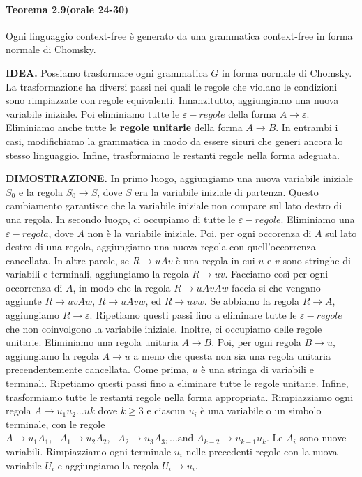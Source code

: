 \documentclass{article}
\begin{document}
\paragraph{Teorema 2.9(orale 24-30)} 
\begin{tcolorbox}[colback=yellow!10!white, colframe=yellow!50!black, title=Teorema 2.9]
    Ogni linguaggio context-free è generato da una grammatica context-free in forma normale di Chomsky.
\end{tcolorbox}

\textbf{IDEA.}
Possiamo trasformare ogni grammatica $G$ in forma normale di Chomsky. La trasformazione ha diversi passi nei quali le regole che violano le condizioni sono rimpiazzate con regole equivalenti. Innanzitutto, aggiungiamo una nuova variabile iniziale. Poi eliminiamo tutte le \textbf{$\varepsilon-regole$} della forma $A \rightarrow \varepsilon$. Eliminiamo anche tutte le \textbf{regole unitarie} della forma $A \rightarrow B$. In entrambi i casi, modifichiamo la grammatica in modo da essere sicuri che generi ancora lo stesso linguaggio. Infine, trasformiamo le restanti regole nella forma adeguata.
\vspace{1em}

\textbf{DIMOSTRAZIONE.}
In primo luogo, aggiungiamo una nuova variabile iniziale $S_0$ e la regola $S_0 \rightarrow S$, dove $S$ era la variabile iniziale di partenza.
Questo cambiamento garantisce che la variabile iniziale non compare sul lato destro di una regola.
In secondo luogo, ci occupiamo di tutte le $\varepsilon-regole$. Eliminiamo una $\varepsilon-regola$, dove $A$ non è la variabile iniziale. Poi, per ogni occorenza di $A$ sul lato destro di una regola, aggiungiamo una nuova regola con quell'occorrenza cancellata. In altre parole, se $R \rightarrow uAv$ è una regola in cui $u$ e $v$ sono stringhe di variabili e terminali, aggiungiamo la regola $R \rightarrow uv$. Facciamo così per ogni occorrenza di $A$, in modo che la regola $R \rightarrow uAvAw$ faccia si che vengano aggiunte $R\rightarrow uvAw$, $R \rightarrow uAvw$, ed $R \rightarrow uvw$. Se abbiamo la regola $R \rightarrow A$, aggiungiamo $R \rightarrow \varepsilon$. Ripetiamo questi passi fino a eliminare tutte le $\varepsilon-regole$ che non coinvolgono la variabile iniziale.
Inoltre, ci occupiamo delle regole unitarie. Eliminiamo una regola unitaria $A \rightarrow B$. Poi, per ogni regola $B \rightarrow u$, aggiungiamo la regola $A \rightarrow u$ a meno che questa non sia una regola unitaria precendentemente cancellata.
Come prima, $u$ è una stringa di variabili e terminali. Ripetiamo questi passi fino a eliminare tutte le regole unitarie.
Infine, trasformiamo tutte le restanti regole nella forma appropriata.
Rimpiazziamo ogni regola $A \rightarrow u_1u_2...uk$ dove $k \geq 3$ e ciascun $u_i$ è una variabile o un simbolo terminale, con le regole $A \rightarrow u_1A_1,\text{ }A_1 \rightarrow u_2A_2,\text{ }A_2 \rightarrow u_3A_3,...\text{and } A_{k-2} \rightarrow u_{k-1}u_k$. Le $A_i$ sono nuove variabili.
Rimpiazziamo ogni terminale $u_i$ nelle precedenti regole con la nuova variabile $U_i$ e aggiungiamo la regola $U_i \rightarrow u_i$.
\vspace{3em}
\end{document}
